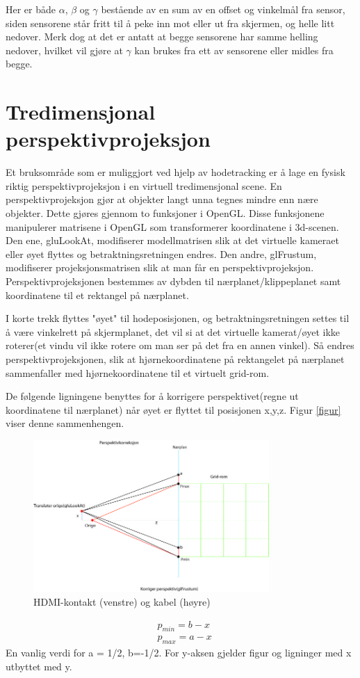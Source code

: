 \documentclass{report}
\begin{document}
Her er både $\alpha$, $\beta$ og $\gamma$ bestående av en sum av en offset og vinkelmål fra sensor, siden
sensorene står fritt til å peke inn mot eller ut fra skjermen, og helle litt nedover. Merk dog at 
det er antatt at begge sensorene har samme helling nedover, hvilket vil gjøre at $\gamma$ kan
brukes fra ett av sensorene eller midles fra begge.

\section{Tredimensjonal perspektivprojeksjon}
Et bruksområde som er muliggjort ved hjelp av hodetracking er å lage en fysisk riktig perspektivprojeksjon
i en virtuell tredimensjonal scene. En perspektivprojeksjon gjør at objekter langt unna tegnes
mindre enn nære objekter.
Dette gjøres gjennom to funksjoner i OpenGL. Disse funksjonene
manipulerer matrisene i OpenGL som transformerer koordinatene i 3d-scenen.
Den ene, gluLookAt, modifiserer modellmatrisen slik at det virtuelle kameraet eller øyet flyttes
og betraktningsretningen endres.  Den andre, glFrustum, modifiserer projeksjonsmatrisen slik at
man får en perspektivprojeksjon. Perspektivprojeksjonen bestemmes av dybden til nærplanet/klippeplanet
samt koordinatene til et rektangel på nærplanet.

I korte trekk flyttes "øyet" til hodeposisjonen, og betraktningsretningen settes til å være vinkelrett på
skjermplanet, det vil si at det virtuelle kamerat/øyet ikke roterer(et vindu vil ikke rotere om man ser på det fra en annen vinkel).
Så endres perspektivprojeksjonen, slik at hjørnekoordinatene på rektangelet på nærplanet sammenfaller med hjørnekoordinatene til
et virtuelt grid-rom. 

De følgende ligningene benyttes for å korrigere perspektivet(regne ut koordinatene til nærplanet) når øyet er flyttet til posisjonen x,y,z. Figur \ref{figur} viser denne sammenhengen.
	\begin{figure}[h]
	\centering
	\includegraphics[width=0.80\textwidth]{graphics/Perspektivkorreksjon.jpg}
	\caption{HDMI-kontakt (venstre) og kabel (høyre)}
	\label{fig:hdmi}
	\end{figure}
\begin{eqnarray}
&p_{min} = b-x\\
&p_{max} = a-x
\end{eqnarray}
En vanlig verdi for a = 1/2, b=-1/2.
For y-aksen gjelder figur og ligninger med x utbyttet med y.
\end{document}
